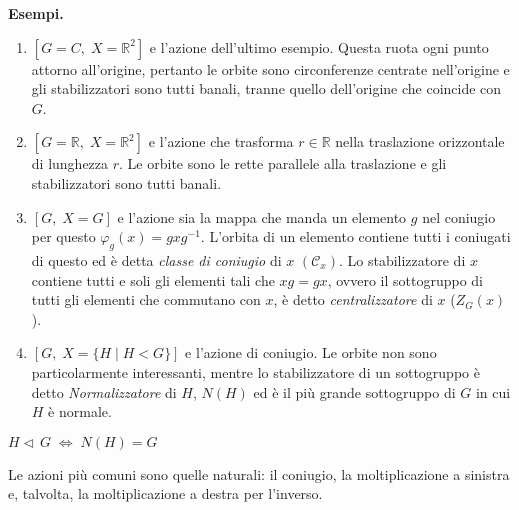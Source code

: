 \begin{multicols}{2}
\textbf{Esempi.}
\begin{enumerate}
	\item $ [G = C,\; X = \mathbb{R}^2 ] $ e l'azione dell'ultimo esempio. Questa ruota ogni punto attorno all'origine, pertanto le orbite sono circonferenze centrate nell'origine e gli stabilizzatori sono tutti banali, tranne quello dell'origine che coincide con $ G $.
	\item $ [G = \mathbb{R},\; X = \mathbb{R}^2 ] $ e l'azione che trasforma $ r \in \mathbb{R} $ nella traslazione orizzontale di lunghezza $ r $. Le orbite sono le rette parallele alla traslazione e gli stabilizzatori sono tutti banali.
	\item $ [G,\; X = G ] $ e l'azione sia la mappa che manda un elemento $ g $ nel coniugio per questo $ \varphi_g(x) = gxg^{-1} $. L'orbita di un elemento contiene tutti i coniugati di questo ed è detta \emph{classe di coniugio} di $ x $ $ (\mathcal{C}_x) $. Lo stabilizzatore di $ x $ contiene tutti e soli gli elementi tali che $ xg = gx $, ovvero il sottogruppo di tutti gli elementi che commutano con $ x $, è detto \emph{centralizzatore} di $ x $ ($ Z_G(x) $).
	\item $ [G,\; X = \{ H \mid H < G \} ] $ e l'azione di coniugio. Le orbite non sono particolarmente interessanti, mentre lo stabilizzatore di un sottogruppo è detto \emph{Normalizzatore} di $ H $, $ N(H) $ ed è il più grande sottogruppo di $ G $ in cui $ H $ è normale.
\end{enumerate}
\begin{remark}
	$ H \lhd\, G \;\Leftrightarrow\; N(H) = G $
\end{remark}
\begin{remark}[euristica]
	Le azioni più comuni sono quelle naturali: il coniugio, la moltiplicazione a sinistra e, talvolta, la moltiplicazione a destra per l'inverso.
\end{remark}
\end{multicols}

